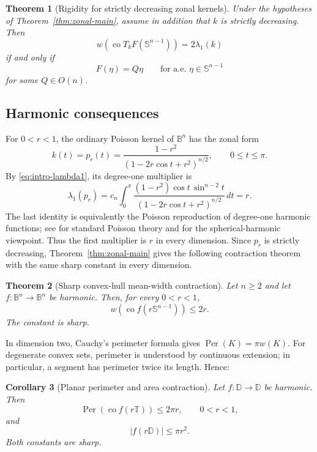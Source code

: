\documentclass[11pt,reqno]{amsart}
\newtheorem{theorem}{Theorem}[section]
\newtheorem{corollary}[theorem]{Corollary}
\theoremstyle{remark}
\begin{document}
\begin{theorem}[Rigidity for strictly decreasing zonal kernels]
\label{thm:zonal-rigidity}
Under the hypotheses of Theorem~\ref{thm:zonal-main}, assume in addition
that $k$ is strictly decreasing.  Then
\[
 w\!\left(
 \operatorname{co}T_kF(\mathbb S^{n-1})
 \right)
 =
 2\lambda_1(k)
\]
if and only if
\[
 F(\eta)=Q\eta
 \qquad\text{for a.e. }\eta\in\mathbb S^{n-1}
\]
for some $Q\in O(n)$.
\end{theorem}

\subsection{Harmonic consequences}

For $0<r<1$, the ordinary Poisson kernel of $\mathbb B^n$ has the
zonal form
\[
 k(t)=p_r(t)
 =
 \frac{1-r^2}{(1-2r\cos t+r^2)^{n/2}},
 \qquad 0\le t\le\pi.
\]
By \eqref{eq:intro-lambda1}, its degree-one multiplier is
\begin{equation}\label{eq:intro-euclidean-first-multiplier}
 \lambda_1(p_r)
 =
 c_n\int_0^\pi
 \frac{(1-r^2)\cos t\,\sin^{n-2}t}
 {(1-2r\cos t+r^2)^{n/2}}\,dt
 =r.
\end{equation}
The last identity is equivalently the Poisson reproduction of degree-one
harmonic functions; see \cite{AxlerBourdonRamey} for standard Poisson theory
and \cite{DaiXu} for the spherical-harmonic viewpoint.  Thus the first
multiplier is $r$ in every dimension.  Since $p_r$ is strictly decreasing,
Theorem~\ref{thm:zonal-main} gives the following contraction theorem with the
same sharp constant in every dimension.

\begin{theorem}[Sharp convex-hull mean-width contraction]
\label{thm:main}
Let $n\ge2$ and let
$f:\mathbb B^n\to\mathbb B^n$ be harmonic.  Then, for every $0<r<1$,
\begin{equation}\label{eq:main}
 w\!\left(\operatorname{co}f(r\mathbb S^{n-1})\right)\le2r.
\end{equation}
The constant is sharp.
\end{theorem}

In dimension two, Cauchy's perimeter formula gives
$\operatorname{Per}(K)=\pi w(K)$.  For degenerate convex sets, perimeter
is understood by continuous extension; in particular, a segment has
perimeter twice its length.  Hence:

\begin{corollary}[Planar perimeter and area contraction]
\label{cor:planar}
Let $f:\mathbb D\to\mathbb D$ be harmonic.  Then
\begin{equation}\label{eq:planar-perimeter}
 \operatorname{Per}\!\left(\operatorname{co}f(r\mathbb T)\right)
 \le2\pi r,
 \qquad 0<r<1,
\end{equation}
and
\begin{equation}\label{eq:planar-area}
 |f(r\mathbb D)|\le\pi r^2.
\end{equation}
Both constants are sharp.
\end{corollary}
\end{document}
